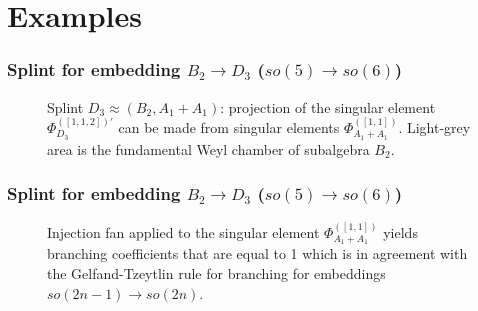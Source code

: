\documentclass[pdftex]{beamer}
\theoremstyle{definition} \newtheorem{Def}{Definition}
\begin{document}
\section{Examples}

\begin{frame}
  \frametitle{Splint for embedding $B_2\rightarrow D_3$ ($so(5)\rightarrow so(6)$)}


  \begin{figure}[h]
    \caption{Splint $D_3\approx (B_2,A_1+A_1)$: projection of the singular element $\Phi_{D_3}^{([1,1,2])'}$ can be made from singular elements $\Phi_{A_1+A_1}^{([1,1])}$. Light-grey area is the fundamental Weyl chamber of subalgebra $B_2$.} 
    \label{ris3}
  \end{figure}
\end{frame}

\begin{frame}
  \frametitle{Splint for embedding $B_2\rightarrow D_3$ ($so(5)\rightarrow so(6)$)}


  \begin{figure}[h]
    \caption{Injection fan applied to the singular element $\Phi_{A_1+A_1}^{([1,1])}$ yields branching coefficients that are equal to 1 which is in agreement with the Gelfand-Tzeytlin rule for branching for embeddings $so(2n-1)\rightarrow so(2n)$. }
    \label{ris5}
  \end{figure}


\end{frame}
\end{document}

